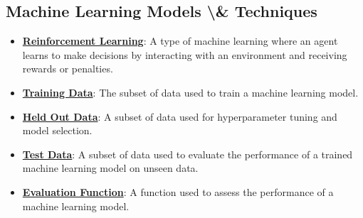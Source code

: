 \documentclass{article}%
\begin{document}
\subsection{Machine Learning Models \textbackslash{}\& Techniques}%
\label{subsec:MachineLearningModelsTechniques}%
\begin{itemize}[leftmargin=*]%
\item \href{https://purdue.brightspace.com/d2l/common/assets/pdfjs-d2l-dist/1.0.14-legacy/web/viewer.html?file=%2Fcontent%2Fenforced%2F1095467-wl.202510.CS.24300.001%2F02L2-Intro.pdf%3Fou%3D1095467&lang=en-us&container=d2l-fileviewer-rendered-pdf&fullscreen=d2l-fileviewer-rendered-pdf-dialog&height=667#page=46}{\textbf{Reinforcement Learning}}: A type of machine learning where an agent learns to make decisions by interacting with an environment and receiving rewards or penalties.%
\item \href{https://purdue.brightspace.com/d2l/common/assets/pdfjs-d2l-dist/1.0.14-legacy/web/viewer.html?file=%2Fcontent%2Fenforced%2F1095467-wl.202510.CS.24300.001%2F10L1-CrossValidation.pdf%3Fou%3D1095467&lang=en-us&container=d2l-fileviewer-rendered-pdf&fullscreen=d2l-fileviewer-rendered-pdf-dialog&height=667#page=6}{\textbf{Training Data}}: The subset of data used to train a machine learning model.%
\item \href{https://purdue.brightspace.com/d2l/common/assets/pdfjs-d2l-dist/1.0.14-legacy/web/viewer.html?file=%2Fcontent%2Fenforced%2F1095467-wl.202510.CS.24300.001%2F10L1-CrossValidation.pdf%3Fou%3D1095467&lang=en-us&container=d2l-fileviewer-rendered-pdf&fullscreen=d2l-fileviewer-rendered-pdf-dialog&height=667#page=6}{\textbf{Held Out Data}}: A subset of data used for hyperparameter tuning and model selection.%
\item \href{https://purdue.brightspace.com/d2l/common/assets/pdfjs-d2l-dist/1.0.14-legacy/web/viewer.html?file=%2Fcontent%2Fenforced%2F1095467-wl.202510.CS.24300.001%2F10L1-CrossValidation.pdf%3Fou%3D1095467&lang=en-us&container=d2l-fileviewer-rendered-pdf&fullscreen=d2l-fileviewer-rendered-pdf-dialog&height=667#page=6}{\textbf{Test Data}}: A subset of data used to evaluate the performance of a trained machine learning model on unseen data.%
\item \href{https://purdue.brightspace.com/d2l/common/assets/pdfjs-d2l-dist/1.0.14-legacy/web/viewer.html?file=%2Fcontent%2Fenforced%2F1095467-wl.202510.CS.24300.001%2F10L1-CrossValidation.pdf%3Fou%3D1095467&lang=en-us&container=d2l-fileviewer-rendered-pdf&fullscreen=d2l-fileviewer-rendered-pdf-dialog&height=667#page=9}{\textbf{Evaluation Function}}: A function used to assess the performance of a machine learning model.%

\end{itemize}
\end{document}
